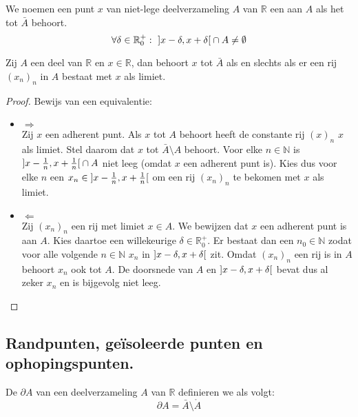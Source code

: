 \documentclass[main.tex]{subfiles}
\begin{document}
\begin{de}
  We noemen een punt $x$ van niet-lege deelverzameling $A$ van $\mathbb{R}$ een  aan $A$ als het tot $\bar{A}$ behoort.
  \[ \forall \delta \in \mathbb{R}_{0}^{+}:\ \interval[open]{x-\delta}{x+\delta} \cap A \neq \emptyset \]
\end{de}

\begin{pr}
  Zij $A$ een deel van $\mathbb{R}$ en $x\in \mathbb{R}$, dan behoort $x$ tot $\bar{A}$ als en slechts als er een rij $(x_{n})_{n}$ in $A$ bestaat met $x$ als limiet.

  \begin{proof}
    Bewijs van een equivalentie:
    \begin{itemize}
    \item $\Rightarrow$\\
      Zij $x$ een adherent punt.
      Als $x$ tot $A$ behoort heeft de constante rij $(x)_{n}$ $x$ als limiet.
      Stel daarom dat $x$ tot $\bar{A}\setminus A$ behoort.
      Voor elke $n\in \mathbb{N}$ is $\interval[open]{x-\frac{1}{n}}{x+\frac{1}{n}} \cap A$ niet leeg (omdat $x$ een adherent punt is).
      Kies dus voor elke $n$ een $x_{n} \in \interval[open]{x-\frac{1}{n}}{x+\frac{1}{n}}$ om een rij $(x_{n})_{n}$ te bekomen met $x$ als limiet.
    \item $\Leftarrow$\\
      Zij $(x_{n})_{n}$ een rij met limiet $x\in A$. We bewijzen dat $x$ een adherent punt is aan $A$.
      Kies daartoe een willekeurige $\delta \in \mathbb{R}_{0}^{+}$.
      Er bestaat dan een $n_{0}\in \mathbb{N}$ zodat voor alle volgende $n\in\mathbb{N}$ $x_{n}$ in $\interval[open]{x-\delta}{x+\delta}$ zit.
      Omdat $(x_{n})_{n}$ een rij is in $A$ behoort $x_{n}$ ook tot $A$.
      De doorsnede van $A$ en $\interval[open]{x-\delta}{x+\delta}$ bevat dus al zeker $x_{n}$ en is bijgevolg niet leeg.
    \end{itemize}
  \end{proof}
  \feed
\end{pr}

\subsection{Randpunten, ge\"isoleerde punten en ophopingspunten.}
\label{sec:randp-geis-punt}

\begin{de}
  De  $\partial A$ van een deelverzameling $A$ van $\mathbb{R}$ definieren we als volgt:
  \[ \partial A = \bar{A} \setminus \mathring{A} \]
\end{de}
\end{document}
